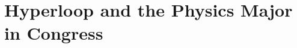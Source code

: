 \documentclass[12pt]{article}
\begin{document}
      \section{Hyperloop and the Physics Major in Congress}

      \section{}

\end{document}
